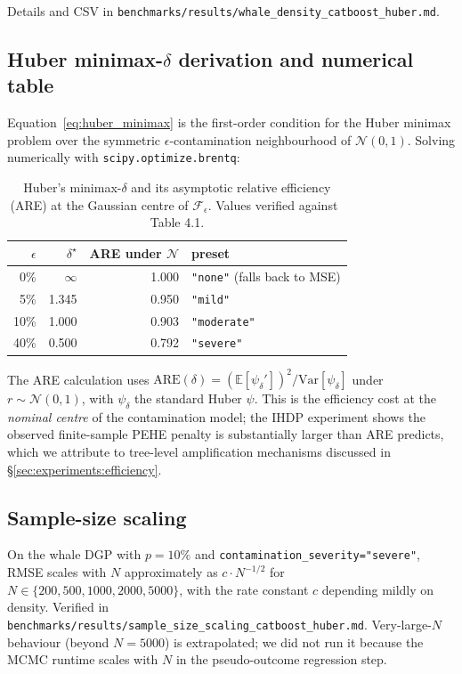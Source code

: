 Details and CSV in
\texttt{benchmarks/results/whale\_density\_catboost\_huber.md}.

\subsection{\texorpdfstring{Huber minimax-$\delta$ derivation and numerical table}{Huber minimax-delta derivation and numerical table}}
\label{app:huber_derivation}
Equation~\ref{eq:huber_minimax} is the first-order condition for
the Huber minimax problem over the symmetric $\epsilon$-contamination
neighbourhood of $\mathcal{N}(0, 1)$. Solving numerically with
\texttt{scipy.optimize.brentq}:

\begin{table}[!t]
\centering
\small
\begin{tabular}{rrrl}
\toprule
$\epsilon$ & $\delta^\star$ & ARE under $\mathcal{N}$ & preset \\
\midrule
0\%    & $\infty$ & 1.000 & \texttt{"none"} (falls back to MSE) \\
5\%    & 1.345    & 0.950 & \texttt{"mild"} \\
10\%   & 1.000    & 0.903 & \texttt{"moderate"} \\
40\%   & 0.500    & 0.792 & \texttt{"severe"} \\
\bottomrule
\end{tabular}
\caption{Huber's minimax-$\delta$ and its asymptotic relative
efficiency (ARE) at the Gaussian centre of $\mathcal{F}_\epsilon$.
Values verified against~\citet{huber2009robust} Table 4.1.}
\label{tab:huber_numerics}
\end{table}

The ARE calculation uses
$\mathrm{ARE}(\delta) = \left(\mathbb{E}[\psi_\delta']\right)^2 /
\mathrm{Var}[\psi_\delta]$ under $r \sim \mathcal{N}(0,1)$, with
$\psi_\delta$ the standard Huber $\psi$. This is the efficiency cost
at the \emph{nominal centre} of the contamination model; the IHDP
experiment shows the observed finite-sample PEHE penalty is
substantially larger than ARE predicts, which we attribute to
tree-level amplification mechanisms discussed in
\S\ref{sec:experiments:efficiency}.

\subsection{Sample-size scaling}
\label{app:scaling}
On the whale DGP with $p = 10\%$ and
\texttt{contamination\_severity="severe"}, RMSE scales with $N$
approximately as $c \cdot N^{-1/2}$ for $N \in \{200, 500, 1000,
2000, 5000\}$, with the rate constant $c$ depending mildly on
density. Verified in
\texttt{benchmarks/results/sample\_size\_scaling\_catboost\_huber.md}.
Very-large-$N$ behaviour (beyond $N = 5000$) is extrapolated; we
did not run it because the MCMC runtime scales with $N$ in the
pseudo-outcome regression step.

